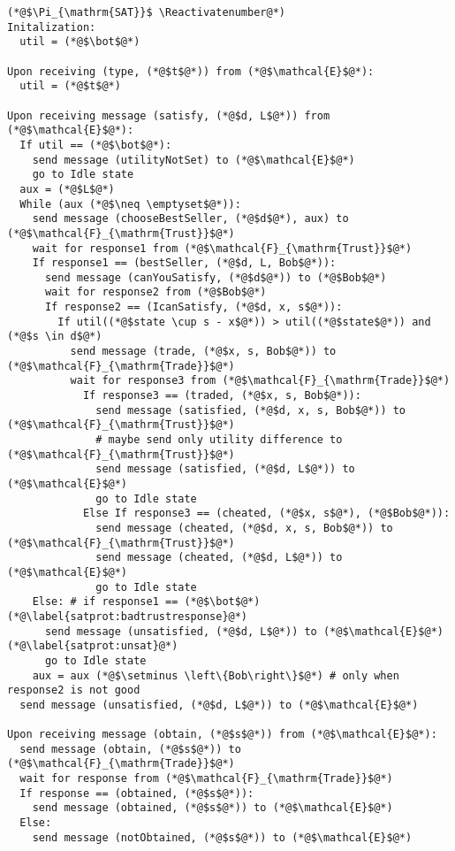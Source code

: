 \Suppressnumber
\begin{lstlisting}[label=satprot, style=numbers]
(*@$\Pi_{\mathrm{SAT}}$ \Reactivatenumber@*)
Initalization:
  util = (*@$\bot$@*)

Upon receiving (type, (*@$t$@*)) from (*@$\mathcal{E}$@*):
  util = (*@$t$@*)

Upon receiving message (satisfy, (*@$d, L$@*)) from (*@$\mathcal{E}$@*):
  If util == (*@$\bot$@*):
    send message (utilityNotSet) to (*@$\mathcal{E}$@*)
    go to Idle state
  aux = (*@$L$@*)
  While (aux (*@$\neq \emptyset$@*)):
    send message (chooseBestSeller, (*@$d$@*), aux) to (*@$\mathcal{F}_{\mathrm{Trust}}$@*)
    wait for response1 from (*@$\mathcal{F}_{\mathrm{Trust}}$@*)
    If response1 == (bestSeller, (*@$d, L, Bob$@*)):
      send message (canYouSatisfy, (*@$d$@*)) to (*@$Bob$@*)
      wait for response2 from (*@$Bob$@*)
      If response2 == (IcanSatisfy, (*@$d, x, s$@*)):
        If util((*@$state \cup s - x$@*)) > util((*@$state$@*)) and (*@$s \in d$@*)
          send message (trade, (*@$x, s, Bob$@*)) to (*@$\mathcal{F}_{\mathrm{Trade}}$@*)
          wait for response3 from (*@$\mathcal{F}_{\mathrm{Trade}}$@*)
            If response3 == (traded, (*@$x, s, Bob$@*)):
              send message (satisfied, (*@$d, x, s, Bob$@*)) to (*@$\mathcal{F}_{\mathrm{Trust}}$@*)
              # maybe send only utility difference to (*@$\mathcal{F}_{\mathrm{Trust}}$@*)
              send message (satisfied, (*@$d, L$@*)) to (*@$\mathcal{E}$@*)
              go to Idle state
            Else If response3 == (cheated, (*@$x, s$@*), (*@$Bob$@*)):
              send message (cheated, (*@$d, x, s, Bob$@*)) to (*@$\mathcal{F}_{\mathrm{Trust}}$@*)
              send message (cheated, (*@$d, L$@*)) to (*@$\mathcal{E}$@*)
              go to Idle state
    Else: # if response1 == (*@$\bot$@*) (*@\label{satprot:badtrustresponse}@*)
      send message (unsatisfied, (*@$d, L$@*)) to (*@$\mathcal{E}$@*) (*@\label{satprot:unsat}@*)
      go to Idle state
    aux = aux (*@$\setminus \left\{Bob\right\}$@*) # only when response2 is not good
  send message (unsatisfied, (*@$d, L$@*)) to (*@$\mathcal{E}$@*)

Upon receiving message (obtain, (*@$s$@*)) from (*@$\mathcal{E}$@*):
  send message (obtain, (*@$s$@*)) to (*@$\mathcal{F}_{\mathrm{Trade}}$@*)
  wait for response from (*@$\mathcal{F}_{\mathrm{Trade}}$@*)
  If response == (obtained, (*@$s$@*)):
    send message (obtained, (*@$s$@*)) to (*@$\mathcal{E}$@*)
  Else:
    send message (notObtained, (*@$s$@*)) to (*@$\mathcal{E}$@*)


\end{lstlisting}
